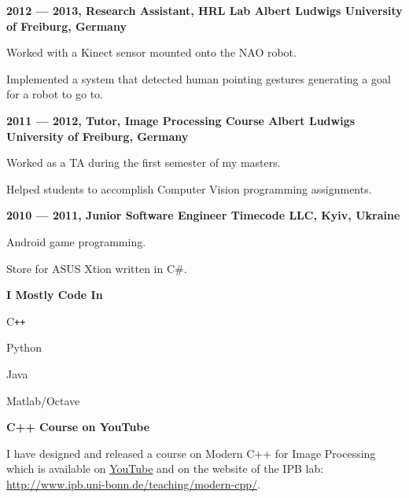 \documentclass[a4paper,12pt,final]{memoir}
\newcommand{\Sep}{\vspace{1.5em}}
\newcommand{\SmallSep}{\vspace{0.5em}}
\newcommand{\CVSection}[1]
	{\Large\textbf{#1}\par
	\SmallSep\normalsize\normalfont}
\newcommand{\CVItem}[1]
	{\textbf{\color{MidnightBlue} #1}}
\begin{document}
\CVItem{2012 --- 2013, Research Assistant, HRL Lab
\newline Albert Ludwigs University of Freiburg, Germany}
\begin{compactitem}[\color{RoyalBlue}$\circ$]
	\item Worked with a Kinect sensor mounted onto the NAO robot.
	\item Implemented a system that detected human pointing gestures generating a
	goal for a robot to go to.
\end{compactitem}
\SmallSep

\CVItem{2011 --- 2012, Tutor, Image Processing Course
\newline Albert Ludwigs University of Freiburg, Germany}
\begin{compactitem}[\color{RoyalBlue}$\circ$]
\item Worked as a TA during the first semester of my masters.
\item Helped students to accomplish Computer Vision programming assignments.
\end{compactitem}
\SmallSep

\CVItem{2010 --- 2011, Junior Software Engineer
\newline Timecode LLC, Kyiv, Ukraine}
\begin{compactitem}[\color{RoyalBlue}$\circ$]
\item Android game programming.
\item Store for ASUS Xtion written in C\#.
\end{compactitem}

\SmallSep
\framebreak
\clearpage
\framebreak{}
	\SmallSep{}
	\vspace{-2mm}

	\CVSection{I Mostly Code In}
	\begin{compactitem}[\color{MidnightBlue}$\circ$]
		\item C\texttt{++}
		\item Python
		\item Java
		\item Matlab/Octave
	\end{compactitem}
	\Sep{}

	\CVSection{C++ Course on YouTube}
	I have designed and released a course on Modern C++ for Image Processing which
	is available on
	\href{https://www.youtube.com/playlist?list=PLgnQpQtFTOGR50iIOtO36nK6aNPtVq98C&disable_polymer=true}{YouTube}
	and on the website of the IPB lab: \\ \tiny\url{http://www.ipb.uni-bonn.de/teaching/modern-cpp/}.
	\Sep{}
\end{document}
